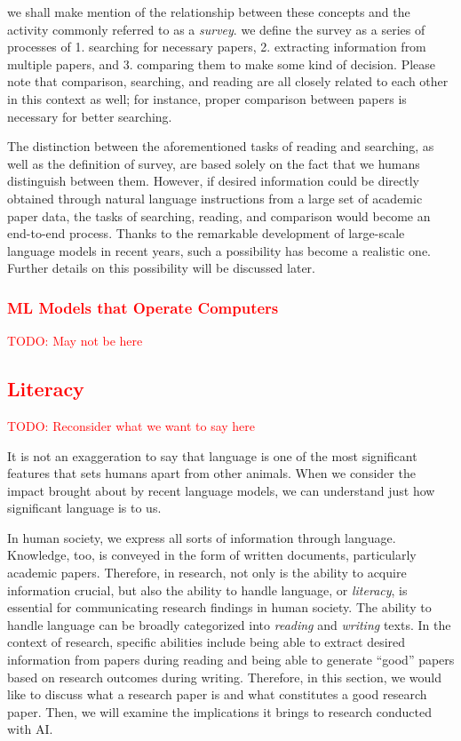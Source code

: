 \documentclass{book}
\begin{document}
we shall make mention of the relationship between these concepts and the activity commonly referred to as a \textit{survey}. we define the survey as a series of processes of 1. searching for necessary papers, 2. extracting information from multiple papers, and 3. comparing them to make some kind of decision. Please note that comparison, searching, and reading are all closely related to each other in this context as well; for instance, proper comparison between papers is necessary for better searching.

The distinction between the aforementioned tasks of reading and searching, as well as the definition of survey, are based solely on the fact that we humans distinguish between them. However, if desired information could be directly obtained through natural language instructions from a large set of academic paper data, the tasks of searching, reading, and comparison would become an end-to-end process. Thanks to the remarkable development of large-scale language models in recent years, such a possibility has become a realistic one. Further details on this possibility will be discussed later.

\subsubsection{\textcolor{red}{ML Models that Operate Computers}}
\textcolor{red}{TODO: May not be here}

\subsection{\textcolor{red}{Literacy}}
\textcolor{red}{TODO: Reconsider what we want to say here}

It is not an exaggeration to say that language is one of the most significant features that sets humans apart from other animals. When we consider the impact brought about by recent language models, we can understand just how significant language is to us.

In human society, we express all sorts of information through language. Knowledge, too, is conveyed in the form of written documents, particularly academic papers. Therefore, in research, not only is the ability to acquire information crucial, but also the ability to handle language, or \textit{literacy}, is essential for communicating research findings in human society. The ability to handle language can be broadly categorized into \textit{reading} and \textit{writing} texts. In the context of research, specific abilities include being able to extract desired information from papers during reading and being able to generate ``good'' papers based on research outcomes during writing. Therefore, in this section, we would like to discuss what a research paper is and what constitutes a good research paper. Then, we will examine the implications it brings to research conducted with AI.
\end{document}

